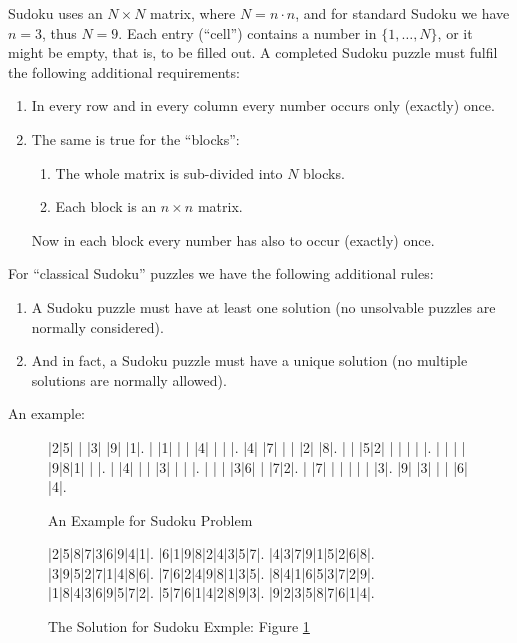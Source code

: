 \documentclass[11pt]{report}
\begin{document}
Sudoku uses an $N \times N$ matrix, where $N = n \cdot n$, and for standard Sudoku we have $n = 3$, thus $N = 9$. Each entry (``cell'') contains a number in $\{1, \dots, N\}$, or it might be empty, that is, to be filled out. A completed Sudoku puzzle must fulfil the following additional requirements:
\begin{enumerate}
\item In every row and in every column every number occurs only (exactly) once.
\item The same is true for the ``blocks'':
  \begin{enumerate}
  \item The whole matrix is sub-divided into $N$ blocks.
  \item Each block is an $n \times n$ matrix.
  \end{enumerate}
  Now in each block every number has also to occur (exactly) once.
\end{enumerate}
For ``classical Sudoku'' puzzles we have the following additional rules:
\begin{enumerate}
\item A Sudoku puzzle must have at least one solution (no unsolvable puzzles are normally considered).
\item And in fact, a Sudoku puzzle must have a unique solution (no multiple solutions are normally allowed).
\end{enumerate}
An example:

\setlength\sudokusize{8cm}
\begin{figure}
\begin{sudoku}
 |2|5| | |3| |9| |1|.
 | |1| | | |4| | | |.
 |4| |7| | | |2| |8|.
 | | |5|2| | | | | |.
 | | | | |9|8|1| | |.
 | |4| | | |3| | | |.
 | | | |3|6| | |7|2|.
 | |7| | | | | | |3|.
 |9| |3| | | |6| |4|.
\end{sudoku}
\label{sudokuEx}
\caption{An Example for Sudoku Problem}
\end{figure}

\begin{figure}
\begin{sudoku}
  |2|5|8|7|3|6|9|4|1|.
  |6|1|9|8|2|4|3|5|7|.
  |4|3|7|9|1|5|2|6|8|.
  |3|9|5|2|7|1|4|8|6|.
  |7|6|2|4|9|8|1|3|5|.
  |8|4|1|6|5|3|7|2|9|.
  |1|8|4|3|6|9|5|7|2|.
  |5|7|6|1|4|2|8|9|3|.
  |9|2|3|5|8|7|6|1|4|.
\end{sudoku}
\caption{The Solution for Sudoku Exmple: Figure \ref{sudokuEx}}
\end{figure}
\end{document}
